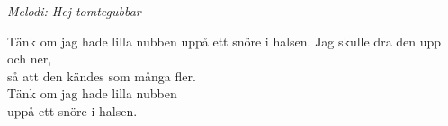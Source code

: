 {\footnotesize\textit{Melodi: Hej tomtegubbar}}\par
\vspace{10pt}
\revrpt Tänk om jag hade lilla nubben
uppå ett snöre i halsen.\rpt
Jag skulle dra den upp och ner,\\
så att den kändes som många fler.\\
Tänk om jag hade lilla nubben\\
uppå ett snöre i halsen.
